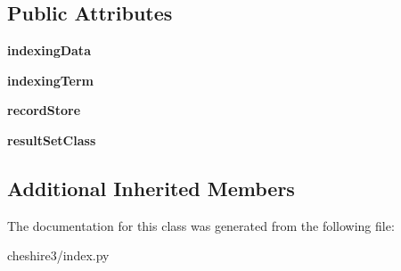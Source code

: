 \subsection*{Public Attributes}
\begin{DoxyCompactItemize}
\item 
\hypertarget{classcheshire3_1_1index_1_1_bitmap_index_ab07a0b6409dc9b0e1d4a224c3056b3c9}{{\bfseries indexing\-Data}}\label{classcheshire3_1_1index_1_1_bitmap_index_ab07a0b6409dc9b0e1d4a224c3056b3c9}

\item 
\hypertarget{classcheshire3_1_1index_1_1_bitmap_index_ac3b23ab51346a187b305379e2d13f05e}{{\bfseries indexing\-Term}}\label{classcheshire3_1_1index_1_1_bitmap_index_ac3b23ab51346a187b305379e2d13f05e}

\item 
\hypertarget{classcheshire3_1_1index_1_1_bitmap_index_af9a99754df692b295013b483e89aa6f3}{{\bfseries record\-Store}}\label{classcheshire3_1_1index_1_1_bitmap_index_af9a99754df692b295013b483e89aa6f3}

\item 
\hypertarget{classcheshire3_1_1index_1_1_bitmap_index_abad38159027d1d1d0028883cbee1902f}{{\bfseries result\-Set\-Class}}\label{classcheshire3_1_1index_1_1_bitmap_index_abad38159027d1d1d0028883cbee1902f}

\end{DoxyCompactItemize}
\subsection*{Additional Inherited Members}


The documentation for this class was generated from the following file\-:\begin{DoxyCompactItemize}
\item 
cheshire3/index.\-py\end{DoxyCompactItemize}
